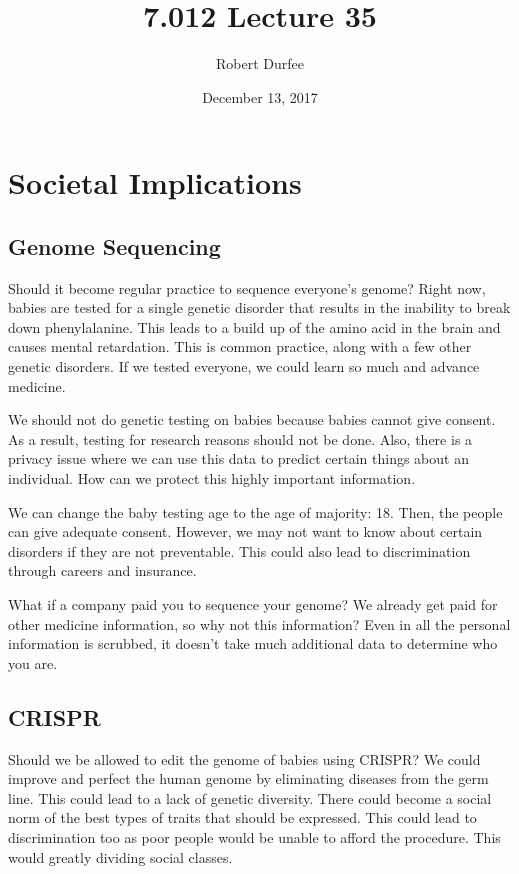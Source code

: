 \documentclass{article}
\title{ 7.012 Lecture 35 }
\author{ Robert Durfee }
\date{ December 13, 2017 }
\begin{document}
\maketitle

\section{ Societal Implications }

\subsection{ Genome Sequencing }

Should it become regular practice to sequence everyone's genome? Right now,
babies are tested for a single genetic disorder that results in the inability to
break down phenylalanine. This leads to a build up of the amino acid in the
brain and causes mental retardation. This is common practice, along with a few
other genetic disorders. If we tested everyone, we could learn so much and
advance medicine.

We should not do genetic testing on babies because babies cannot give consent.
As a result, testing for research reasons should not be done. Also, there is a
privacy issue where we can use this data to predict certain things about an
individual. How can we protect this highly important information.

We can change the baby testing age to the age of majority: 18. Then, the people
can give adequate consent. However, we may not want to know about certain
disorders if they are not preventable. This could also lead to discrimination
through careers and insurance.

What if a company paid you to sequence your genome? We already get paid for
other medicine information, so why not this information? Even in all the
personal information is scrubbed, it doesn't take much additional data to
determine who you are.

\subsection{CRISPR}

Should we be allowed to edit the genome of babies using CRISPR? We could improve
and perfect the human genome by eliminating diseases from the germ line. This
could lead to a lack of genetic diversity. There could become a social norm of
the best types of traits that should be expressed. This could lead to
discrimination too as poor people would be unable to afford the procedure. This
would greatly dividing social classes.
\end{document}
